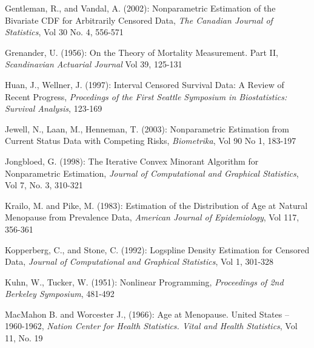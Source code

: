 \documentclass[10pt]{article}
\begin{document}
\vspace{3mm}

Gentleman, R., and Vandal, A. (2002): Nonparametric Estimation of the Bivariate CDF for Arbitrarily Censored Data, \emph{The Canadian Journal of Statistics}, Vol 30 No. 4, 556-571

\vspace{3mm}

Grenander, U. (1956): On the Theory of Mortality Measurement. Part II, \emph{Scandinavian Actuarial Journal} Vol 39, 125-131


\vspace{3mm}

Huan, J., Wellner, J. (1997): Interval Censored Survival Data: A Review of Recent Progress, \emph{Procedings of the First Seattle Symposium in Biostatistics: Survival Analysis}, 123-169

\vspace{3mm}

Jewell, N., Laan, M., Henneman, T. (2003): Nonparametric Estimation from Current Status Data with Competing Risks, \emph{Biometrika}, Vol 90 No 1, 183-197

\vspace{3mm}

Jongbloed, G. (1998): The Iterative Convex Minorant Algorithm for Nonparametric Estimation, \emph{Journal of Computational and Graphical Statistics}, Vol 7, No. 3, 310-321

\vspace{3mm}

Krailo, M. and Pike, M. (1983): Estimation of the Distribution of Age at Natural Menopause from Prevalence Data, \emph{American Journal of Epidemiology}, Vol 117, 356-361

\vspace{3mm}

Kopperberg, C., and Stone, C. (1992): Logspline Density Estimation for Censored Data, \emph{Journal of Computational and Graphical Statistics}, Vol 1, 301-328

\vspace{3mm}

Kuhn, W., Tucker, W. (1951): Nonlinear Programming, \emph{Proceedings of 2nd Berkeley Symposium}, 481-492

\vspace{3mm}

MacMahon B. and Worcester J., (1966): Age at Menopause. United States -- 1960-1962, \emph{Nation Center for Health Statistics. Vital and Health Statistics}, Vol 11, No. 19
\end{document}
